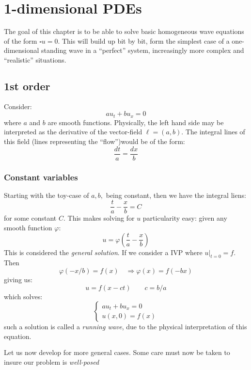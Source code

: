 \documentclass{book}
\renewcommand{\phi}{\varphi}
\newcommand{\Rw}{\Rightarrow}
\begin{document}
\chapter{1-dimensional PDEs}

The goal of this chapter is to be able to solve basic homogeneous wave equations of the form $\square u = 0$.
This will build up bit by bit, form the simplest case of a one-dimensional standing wave in a ``perfect''
system, increasingly more complex and ``realistic'' situations.

\section{1st order}

Consider:
\[
	au_t + bu_x = 0
\]
where $a$ and $b$ are smooth functions. Physically, the left hand side may be interpreted as the derivative of the vector-field $\ell =
(a,b)$. The integral lines of this field (lines representing the ``flow'')would be of the form:
\[
	\frac{dt}{a} = \frac{dx}{b}
\]
\subsection*{Constant variables}

Starting with the toy-case of $a,b,$ being constant, then we have the integral liens:
\[
	\frac{t}{a}  - \frac{x}{b} = C
\]
for some constant $C$. This makes solving for $u$ particularity easy: given any smooth function $\phi$:
\[
	u = \phi \left( \frac{t}{a} - \frac{x}{b}\right)
\]
This is considered the \emph{general solution}. If we consider a IVP where $u|_{t=0} = f$. Then
\[
	\phi(-x/b) = f(x) \quad \Rw \phi(x) = f(-bx)
\]
giving us:
\[
	u = f(x-ct) \qquad c = b/a
\]
which solves:
\[
	\begin{cases}
		au_t + bu_x = 0\\
		u(x,0) = f(x)
	\end{cases}
\]
such a solution is called a \emph{running wave}, due to the physical interpretation of this equation.

Let us now develop for more general cases. Some care must now be taken to insure our problem is
\emph{well-posed}
\end{document}
